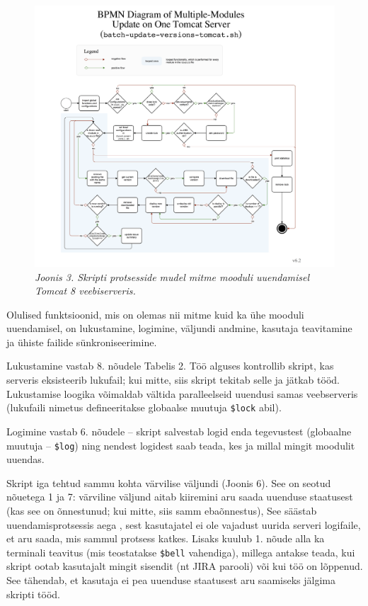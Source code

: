 \documentclass[12pt]{article}
\newcommand{\code}[1]{\texttt{#1}}
\begin{document}
   \begin{figure}[H]
     \begin{center}
       \includegraphics[width=\textwidth]{diagrams/BPMN-diagram-multiple-module-update-tomcat.png}
       \caption*{\textit{Joonis 3. Skripti protsesside mudel mitme mooduli uuendamisel Tomcat 8 veebiserveris.}}
     \end{center}
   \end{figure}
   
   \newpage
   
   Olulised funktsioonid, mis on olemas nii mitme kuid ka ühe mooduli uuendamisel, on lukustamine, logimine, väljundi andmine, kasutaja teavitamine ja ühiste failide sünkroniseerimine.
   
   Lukustamine vastab 8. nõudele Tabelis 2. Töö alguses kontrollib skript, kas serveris eksisteerib lukufail; kui mitte, siis skript tekitab selle ja jätkab tööd. Lukustamise loogika võimaldab vältida paralleelseid uuendusi samas veebserveris (lukufaili nimetus defineeritakse globaalse muutuja \code{\$lock} abil).
   
   Logimine vastab 6. nõudele \--- skript salvestab logid enda tegevustest (globaalne muutuja \--- \code{\$log}) ning nendest logidest saab teada, kes ja millal mingit moodulit uuendas.
   
   Skript iga tehtud sammu kohta värvilise väljundi (Joonis 6). See on seotud nõuetega 1 ja 7: värviline väljund aitab kiiremini aru saada uuenduse staatusest (kas see on õnnestunud; kui mitte, siis samm ebaõnnestus), See säästab uuendamisprotsessis aega , sest kasutajatel ei ole vajadust uurida serveri logifaile, et aru saada, mis sammul protsess katkes. Lisaks kuulub 1. nõude alla ka terminali teavitus (mis teostatakse \code{\$bell} vahendiga), millega antakse teada, kui skript ootab kasutajalt mingit sisendit (nt JIRA parooli) või kui töö on lõppenud. See tähendab, et kasutaja ei pea uuenduse staatusest aru saamiseks jälgima skripti tööd.
   
\end{document}

